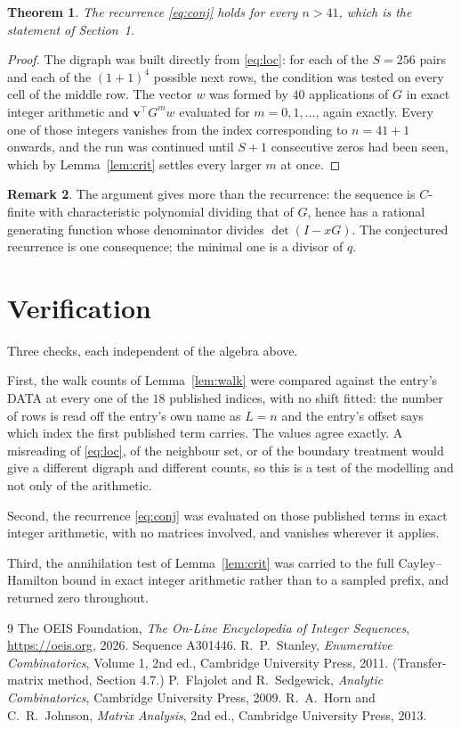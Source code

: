 \documentclass[11pt,a4paper]{article}
\theoremstyle{plain}
\newtheorem{theorem}{Theorem}
\theoremstyle{definition}
\newtheorem{remark}[theorem]{Remark}
\begin{document}
\begin{theorem}
The recurrence \eqref{eq:conj} holds for every $n>41$, which is the statement of
Section~1.
\end{theorem}

\begin{proof}
The digraph was built directly from \eqref{eq:loc}: for each of the $S=256$ pairs and each
of the $(1+1)^{4}$ possible next rows, the condition was tested on every cell of
the middle row. The vector $w$ was formed by $40$ applications of $G$ in exact integer
arithmetic and $\mathbf{v}^{\!\top}G^{m}w$ evaluated for $m=0,1,\dots$, again exactly.
Every one of those integers vanishes from the index corresponding to $n=41+1$ onwards,
and the run was continued until $S+1$ consecutive zeros had been seen, which by
Lemma~\ref{lem:crit} settles every larger $m$ at once.
\end{proof}

\begin{remark}
The argument gives more than the recurrence: the sequence is $C$-finite with characteristic
polynomial dividing that of $G$, hence has a rational generating function whose denominator
divides $\det(I-xG)$. The conjectured recurrence is one consequence; the minimal one is a
divisor of $q$.
\end{remark}

\section{Verification}

Three checks, each independent of the algebra above.

First, the walk counts of Lemma~\ref{lem:walk} were compared against the entry's DATA at
every one of the $18$ published indices, with no shift fitted: the number of rows is
read off the entry's own name as $L=n$ and the entry's offset says which index the first
published term carries. The values agree exactly. A misreading of \eqref{eq:loc}, of the
neighbour set, or of the boundary treatment would give a different digraph and different
counts, so this is a test of the modelling and not only of the arithmetic.

Second, the recurrence \eqref{eq:conj} was evaluated on those published terms in exact
integer arithmetic, with no matrices involved, and vanishes wherever it applies.

Third, the annihilation test of Lemma~\ref{lem:crit} was carried to the full
Cayley--Hamilton bound in exact integer arithmetic rather than to a sampled prefix, and
returned zero throughout.

\begin{thebibliography}{9}
 The OEIS Foundation, \emph{The On-Line Encyclopedia of Integer
Sequences}, \url{https://oeis.org}, 2026. Sequence A301446.
 R.~P.~Stanley, \emph{Enumerative Combinatorics}, Volume 1, 2nd ed.,
Cambridge University Press, 2011. (Transfer-matrix method, Section 4.7.)
 P.~Flajolet and R.~Sedgewick, \emph{Analytic Combinatorics}, Cambridge
University Press, 2009.
 R.~A.~Horn and C.~R.~Johnson, \emph{Matrix Analysis}, 2nd ed., Cambridge
University Press, 2013.
\end{thebibliography}
\end{document}
